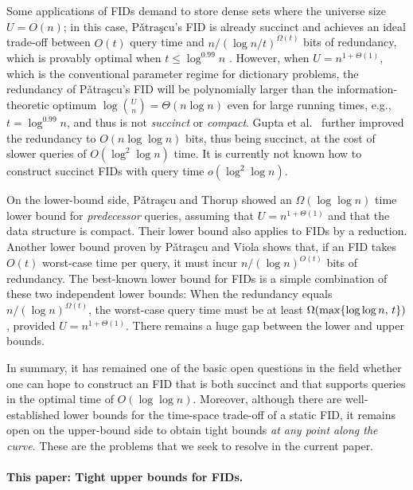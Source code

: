\documentclass{article}
\theoremstyle{plain}
\theoremstyle{definition}  \newtheorem{definition}[theorem]{Definition}
\DeclarePairedDelimiter{\BK}{\{}{\}}
\newcommand{\Patrascu}{\textup{P{\v{a}}tra{\c{s}}cu}\xspace}
\begin{document}
Some applications of FIDs demand to store dense sets where the universe size $U = O(n)$; in this case, \Patrascu's FID is already succinct and achieves an ideal trade-off between $O(t)$ query time and $n / (\log n / t)^{\Omega(t)}$ bits of redundancy, which is provably optimal when $t \le \log^{0.99} n$ \cite{patrascu2010cellprobe, viola2023new}. However, when $U = n^{1 + \Theta(1)}$, which is the conventional parameter regime for dictionary problems, the redundancy of \Patrascu's FID will be polynomially larger than the information-theoretic optimum $\log \binom{U}{n} = \Theta(n \log n)$ even for large running times, e.g., $t = \log^{0.99} n$, and thus is not \emph{succinct} or \emph{compact}.
Gupta et al.~\cite{gupta2007compressed} further improved the redundancy to $O(n \log \log n)$ bits, thus being succinct, at the cost of slower queries of $O(\log^2 \log n)$ time. It is currently not known how to construct succinct FIDs with query time $o(\log^2 \log n)$.

On the lower-bound side, \Patrascu and Thorup \cite{patrascu2006timespace} showed an $\Omega(\log \log n)$ time lower bound for \emph{predecessor} queries, assuming that $U = n^{1 + \Theta(1)}$ and that the data structure is compact. Their lower bound also applies to FIDs by a reduction. Another lower bound proven by \Patrascu and Viola \cite{patrascu2010cellprobe, viola2023new} shows that, if an FID takes $O(t)$ worst-case time per query, it must incur $n / (\log n)^{O(t)}$ bits of redundancy.
The best-known lower bound for FIDs is a simple combination of these two independent lower bounds: When the redundancy equals $n / (\log n)^{\Omega(t)}$, the worst-case query time must be at least $\Omega(\max\BK{\log \log n, \, t})$, provided $U = n^{1 + \Theta(1)}$. There remains a huge gap between the lower and upper bounds.

In summary, it has remained one of the basic open questions in the field whether one can hope to construct an FID that is both succinct and that supports queries in the optimal time of $O(\log \log n)$. Moreover, although there are well-established lower bounds for the time-space trade-off of a static FID, it remains open on the upper-bound side to obtain tight bounds \emph{at any point along the curve}. These are the problems that we seek to resolve in the current paper. 

\paragraph{This paper: Tight upper bounds for FIDs.}
\end{document}
